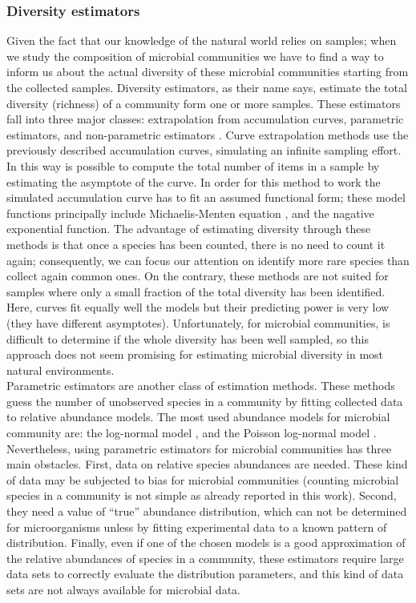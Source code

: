 \subsubsection*{Diversity estimators}
Given the fact that our knowledge of the natural world relies on samples; when we study the composition of microbial communities we have to find a way to inform us about the actual diversity of these microbial communities starting from the collected samples. Diversity estimators, as their name says, estimate the total diversity (richness) of a community form one or more samples. These estimators fall into three major classes: extrapolation from accumulation curves, parametric estimators, and non-parametric estimators \cite{hughes2001counting}. Curve extrapolation methods use the previously described accumulation curves, simulating an infinite sampling effort. In this way is possible to compute the total number of items in a sample by estimating the asymptote of the curve. In order for this method to work the simulated accumulation curve has to fit an assumed functional form; these model functions principally include Michaelis-Menten equation \cite{johnson2011original}, and the nagative exponential function. The advantage of estimating diversity through these methods is that once a species has been counted, there is no need to count it again; consequently, we can focus our attention on identify more rare species than collect again common ones. On the contrary, these methods are not suited for samples where only a small fraction of the total diversity has been identified. Here, curves fit equally well the models but their predicting power is very low (they have different asymptotes). Unfortunately, for microbial communities, is difficult to determine if the whole diversity has been well sampled, so this approach does not seem promising for estimating microbial diversity in most natural environments.\\
Parametric estimators are another class of estimation methods. These methods guess the number of unobserved species in a community by fitting collected data to relative abundance models. The most used abundance models for microbial community are: the log-normal model \cite{hill2003using, dumbrell2009relative}, and the Poisson log-normal model \cite{bulmer1974fitting, bohannan2003new}. Nevertheless, using parametric estimators for microbial communities has three main obstacles. First, data on relative species abundances are needed. These kind of data may be subjected to bias for microbial communities (counting microbial species in a community is not simple as already reported in this work). Second, they need a value of ``true'' abundance distribution, which can not be determined for microorganisms unless by fitting experimental data to a known pattern of distribution. Finally, even if one of the chosen models is a good approximation of the relative abundances of species in a community, these estimators require large data sets to correctly evaluate the distribution parameters, and this kind of data sets are not always available for microbial data.\\
